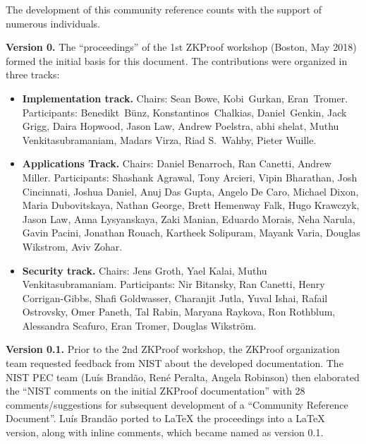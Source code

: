 \label{sec:prelim:acknowledgments}


The development of this community reference counts with the support of numerous individuals.


\textbf{Version 0.}
The ``proceedings'' of the 1st ZKProof workshop (Boston, May 2018) formed the initial basis for this document.
The contributions were organized in three tracks:

\begin{itemize}\setlength{\itemsep}{1ex}
	
\item \textbf{Implementation track.} 
	Chairs: Sean Bowe, Kobi Gurkan, Eran Tromer.
	Participants: Benedikt Bünz, Konstantinos Chalkias, Daniel Genkin, Jack Grigg, Daira Hopwood, Jason Law, Andrew Poelstra, abhi shelat, Muthu Venkita\-subramaniam, Madars Virza, Riad S.\ Wahby, Pieter Wuille.
	
\item \textbf{Applications Track.}
	Chairs: Daniel Benarroch, Ran Canetti, Andrew Miller.
	Participants: Shashank Agrawal, Tony Arcieri, Vipin Bharathan, Josh Cincinnati, Joshua Daniel,  Anuj Das Gupta, Angelo De Caro, Michael Dixon, Maria Dubovitskaya, Nathan George, Brett Hemenway Falk, Hugo Krawczyk, Jason Law, Anna Lysyanskaya, Zaki Manian, Eduardo Morais, Neha Narula, Gavin Pacini, Jonathan Rouach, Kartheek Solipuram, Mayank Varia, Douglas Wikstrom, Aviv Zohar.

\item \textbf{Security track.}
	Chairs: Jens Groth, Yael Kalai, Muthu Venkitasubramaniam.
	Participants: Nir Bitansky, Ran Canetti, Henry Corrigan-Gibbs, Shafi Goldwasser, Charanjit Jutla, Yuval Ishai, Rafail Ostrovsky, Omer Paneth, Tal Rabin, Maryana Raykova, Ron Rothblum, Alessandra Scafuro, Eran Tromer, Douglas Wikström.

\end{itemize}


\textbf{Version 0.1.}
	Prior to the 2nd ZKProof workshop, the ZKProof organization team requested feedback from NIST about the developed documentation.
	The NIST PEC team (Luís Brandão, René Peralta, Angela Robinson) then elaborated the 
``NIST comments on the initial ZKProof documentation'' with 28 comments/suggestions 
for subsequent development of a ``Community Reference Document''.
	Luís Brandão ported to LaTeX the proceedings into a LaTeX version, along with inline comments, which became named as version 0.1.


